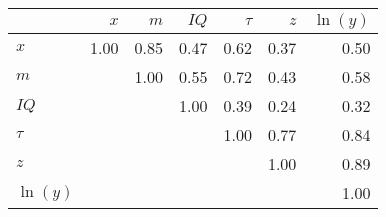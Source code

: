 \begin{tabular}{lrrrrrr}
\hline
 & $x$  & $m$  & $IQ$  & $\tau$  & $z$  & $\ln(y)$  \\ 
\hline
$x$ & 1.00  & 0.85  & 0.47  & 0.62  & 0.37  & 0.50  \\ 
$m$ &   & 1.00  & 0.55  & 0.72  & 0.43  & 0.58  \\ 
$IQ$ &   &   & 1.00  & 0.39  & 0.24  & 0.32  \\ 
$\tau$ &   &   &   & 1.00  & 0.77  & 0.84  \\ 
$z$ &   &   &   &   & 1.00  & 0.89  \\ 
$\ln(y)$ &   &   &   &   &   & 1.00  \\ 
\hline
\end{tabular}%
